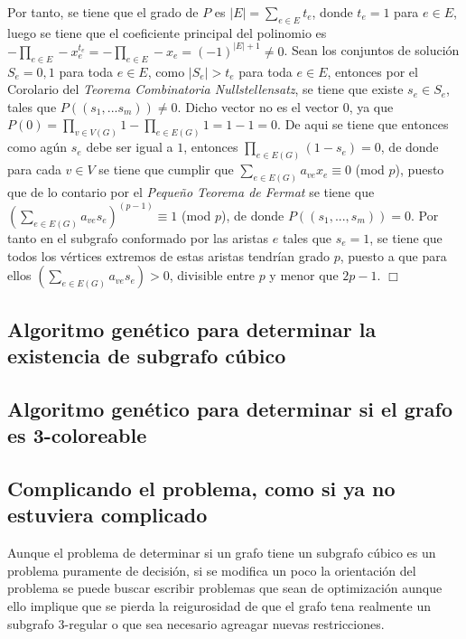 \documentclass{article}
\begin{document}
Por tanto, se tiene que el grado de $P$ es $|E| = \sum_{e \in E} t_e$, donde $t_e = 1$ para $e \in E$, luego se tiene que el 
coeficiente principal del polinomio es $- \prod_{e \in E}  - x_e^{t_e} = - \prod_{e \in E} - x_e = (-1)^{|E| + 1} \neq 0$. Sean los 
conjuntos de soluci\'on $S_e = {0,1}$ para toda $e \in E$, como $|S_e| > t_e$ para toda $e \in E$, entonces por el Corolario del \textit{Teorema Combinatoria Nullstellensatz}, se tiene 
que existe $s_e \in S_e$, tales que $P((s_1,...s_m))  \neq 0$. Dicho vector no es el vector $0$, ya que $P(0) = \prod_{v \in V(G)}  1 - \prod_{e \in E(G)} 1 = 1 - 1 = 0$. De aqui se tiene que entonces 
como ag\'un $s_e$ debe ser igual a $1$, entonces $\prod_{e \in E(G)} (1 - s_e) = 0$, de donde para cada $v \in V$ se tiene que cumplir que 
$\sum_{e \in E(G)} a_{ve} x_e \equiv 0$ (mod $p$), puesto que de lo contario por el \textit{Peque\~no Teorema de Fermat} se tiene que $(\sum_{e \in E(G)} a_{ve} s_e)^(p-1) \equiv 1$ (mod $p$), de donde 
$P((s_1,...,s_m)) = 0 $. Por tanto en el subgrafo conformado por las aristas $e$ tales que $s_e = 1$, se tiene que todos los v\'ertices extremos de estas aristas tendr\'ian grado $p$, puesto a que para ellos
$(\sum_{e \in E(G)} a_{ve} s_e) > 0$, divisible entre $p$ y menor que $2p-1$. $\Box $


\subsection*{Algoritmo gen\'etico para determinar la existencia de subgrafo c\'ubico}

\subsection*{Algoritmo gen\'etico para determinar si el grafo es 3-coloreable}

\subsection*{Complicando el problema, como si ya no estuviera complicado}
Aunque el problema de determinar si un grafo tiene un subgrafo c\'ubico es un problema puramente de decisi\'on, 
si se modifica un poco la orientaci\'on del problema se puede buscar escribir problemas que sean de optimizaci\'on 
aunque ello implique que se pierda la reigurosidad de que el grafo tena realmente un subgrafo $3$-regular o que 
sea necesario agreagar nuevas restricciones.\\
\end{document}
